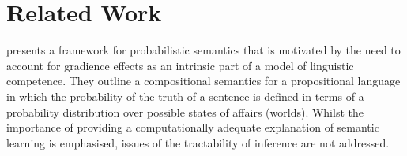 \documentclass[a4paper,11pt]{article}
\renewcommand{\cite}{\citep}
\newcommand{\newcite}[1]{\citet{#1}}
\theoremstyle{definition}
\begin{document}



\section{Related Work}


\newcite{Eijck:12} presents a framework for probabilistic semantics that is motivated by the need to account for gradience effects as an intrinsic part of a model of linguistic competence. They outline a compositional semantics for a propositional language in which the probability of the truth of a sentence is defined in terms of a probability distribution over possible states of affairs (worlds). Whilst the importance of providing a computationally adequate explanation of semantic learning is emphasised, issues of the tractability of inference are not addressed. 
\end{document}
